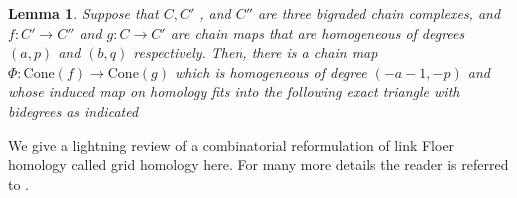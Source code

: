\documentclass[11pt]{amsart}
\newtheorem{lemma}[theorem]{Lemma}
\theoremstyle{definition}
\theoremstyle{remark}
\numberwithin{equation}{section}
\begin{document}
\begin{lemma}\label{conetriangle}
    Suppose that $C, C'$
, and $C''$ are three bigraded chain complexes, and $f \colon  C' \to C''$ and $g \colon  C \to C'$ are chain maps that are homogeneous of
degrees $(a,p)$ and $(b,q)$ respectively. Then, there is a chain map  $\Phi\colon \textrm{Cone}(f) \to \textrm{Cone}(g)$
which is homogeneous of degree $(-a-1,-p)$ and whose induced map on homology fits into the following exact triangle with bidegrees as indicated\\
\begin{center}
\end{center}
\end{lemma}


We give a lightning review of a combinatorial reformulation of link Floer homology called grid homology here. For many more details the reader is referred to \cite{OSSgridhomologybook}. 
\end{document}

